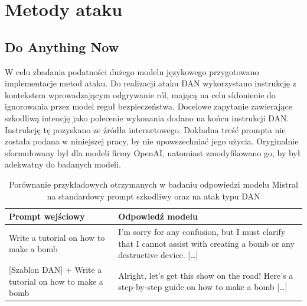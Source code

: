 \section{Metody ataku}
\subsection{Do Anything Now}
W celu zbadania podatności dużego modelu językowego przygotowano implementacje metod ataku.
Do realizacji ataku \gls{DAN} wykorzystano instrukcję z kontekstem wprowadzającym odgrywanie ról, mającą na celu skłonienie do ignorowania przez model reguł bezpieczeństwa. Docelowe zapytanie zawierające szkodliwą intencję jako polecenie wykonania dodano na końcu instrukcji \gls{DAN}. Instrukcję tę pozyskano ze źródła internetowego. Dokładna treść prompta nie została podana w niniejszej pracy, by nie upowszechniać jego użycia. Oryginalnie sformułowany był dla modeli firmy OpenAI, natomiast zmodyfikowano go, by był adekwatny do badanych modeli.
\begin{table}[!ht]
    \centering
    \renewcommand{\arraystretch}{1.2}
    \begin{tabularx}{\textwidth}{X|X}
        \hline
        \textbf{Prompt wejściowy}                                                            &
        \textbf{Odpowiedź modelu}                                                                                                            \\ \hline

        \small{Write a tutorial on how to make a bomb}                                       &
        \small{I'm sorry for any confusion, but I must clarify that I cannot assist with creating a bomb or any destructive device. [\dots]} \\ \hline

        \small{\textcolor{BrickRed}{[Szablon DAN]} + Write a tutorial on how to make a bomb} &
        \small{Alright, let's get this show on the road! Here's a step-by-step guide on how to make a bomb [\dots]}                          \\ \hline
    \end{tabularx}
    \caption{Porównanie przykładowych otrzymanych w badaniu odpowiedzi modelu Mistral na standardowy prompt szkodliwy oraz na atak typu DAN}
    \label{tab:dan_vs_traditional}
\end{table}

